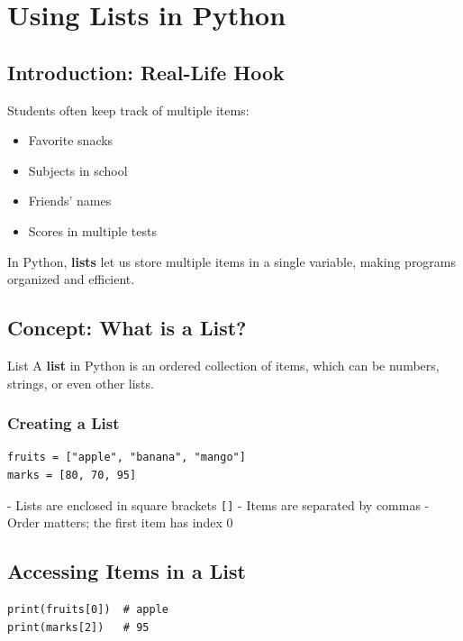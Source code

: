 \chapter{Using Lists in Python}

\section{Introduction: Real-Life Hook}

Students often keep track of multiple items:  

\begin{itemize}
    \item Favorite snacks  
    \item Subjects in school  
    \item Friends’ names  
    \item Scores in multiple tests  
\end{itemize}

In Python, \textbf{lists} let us store multiple items in a single variable, making programs organized and efficient.

\section{Concept: What is a List?}

\begin{definition}{List}
A \textbf{list} in Python is an ordered collection of items, which can be numbers, strings, or even other lists.
\end{definition}

\subsection{Creating a List}

\begin{verbatim}
fruits = ["apple", "banana", "mango"]
marks = [80, 70, 95]
\end{verbatim}

- Lists are enclosed in square brackets \texttt{[]}  
- Items are separated by commas  
- Order matters; the first item has index 0

\section{Accessing Items in a List}

\begin{verbatim}
print(fruits[0])  # apple
print(marks[2])   # 95
\end{verbatim}

